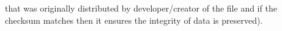 that was originally distributed by developer/creator of the file and if the
checksum matches then it ensures the integrity of data is preserved). 


